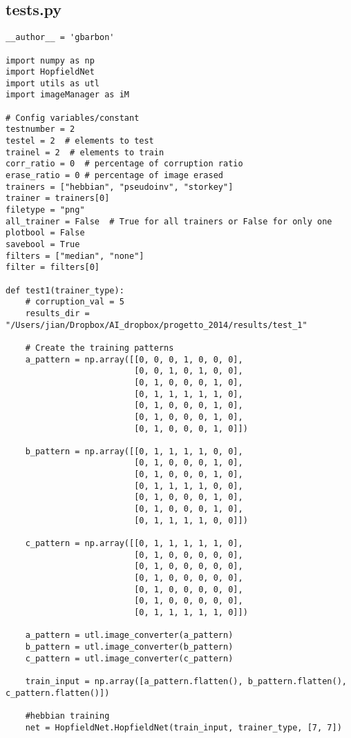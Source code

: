 \documentclass[letterpaper,twocolumn,10pt]{article}
\begin{document}
\subsection{tests.py}
\begin{lstlisting}
__author__ = 'gbarbon'

import numpy as np
import HopfieldNet
import utils as utl
import imageManager as iM

# Config variables/constant
testnumber = 2
testel = 2  # elements to test
trainel = 2  # elements to train
corr_ratio = 0  # percentage of corruption ratio
erase_ratio = 0 # percentage of image erased
trainers = ["hebbian", "pseudoinv", "storkey"]
trainer = trainers[0]
filetype = "png"
all_trainer = False  # True for all trainers or False for only one
plotbool = False
savebool = True
filters = ["median", "none"]
filter = filters[0]

def test1(trainer_type):
    # corruption_val = 5
    results_dir = "/Users/jian/Dropbox/AI_dropbox/progetto_2014/results/test_1"

    # Create the training patterns
    a_pattern = np.array([[0, 0, 0, 1, 0, 0, 0],
                          [0, 0, 1, 0, 1, 0, 0],
                          [0, 1, 0, 0, 0, 1, 0],
                          [0, 1, 1, 1, 1, 1, 0],
                          [0, 1, 0, 0, 0, 1, 0],
                          [0, 1, 0, 0, 0, 1, 0],
                          [0, 1, 0, 0, 0, 1, 0]])

    b_pattern = np.array([[0, 1, 1, 1, 1, 0, 0],
                          [0, 1, 0, 0, 0, 1, 0],
                          [0, 1, 0, 0, 0, 1, 0],
                          [0, 1, 1, 1, 1, 0, 0],
                          [0, 1, 0, 0, 0, 1, 0],
                          [0, 1, 0, 0, 0, 1, 0],
                          [0, 1, 1, 1, 1, 0, 0]])

    c_pattern = np.array([[0, 1, 1, 1, 1, 1, 0],
                          [0, 1, 0, 0, 0, 0, 0],
                          [0, 1, 0, 0, 0, 0, 0],
                          [0, 1, 0, 0, 0, 0, 0],
                          [0, 1, 0, 0, 0, 0, 0],
                          [0, 1, 0, 0, 0, 0, 0],
                          [0, 1, 1, 1, 1, 1, 0]])

    a_pattern = utl.image_converter(a_pattern)
    b_pattern = utl.image_converter(b_pattern)
    c_pattern = utl.image_converter(c_pattern)

    train_input = np.array([a_pattern.flatten(), b_pattern.flatten(), c_pattern.flatten()])

    #hebbian training
    net = HopfieldNet.HopfieldNet(train_input, trainer_type, [7, 7])


\end{lstlisting}
\end{document}
